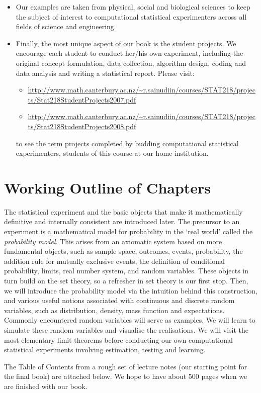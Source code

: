 \begin{itemize}
\begin{itemize}
\item Our examples are taken from physical, social and biological sciences to keep the subject of interest to computational statistical experimenters across all fields of science and engineering.
\item Finally, the most unique aspect of our book is the student projects.  We encourage each student to conduct her/his own experiment, including the original concept formulation, data collection, algorithm design, coding and data analysis and writing a statistical report. Please visit:
\begin{itemize}
\item
\href{http://www.math.canterbury.ac.nz/~r.sainudiin/courses/STAT218/projects/Stat218StudentProjects2007.pdf}{\url{http://www.math.canterbury.ac.nz/~r.sainudiin/courses/STAT218/projects/Stat218StudentProjects2007.pdf}} \item
\href{http://www.math.canterbury.ac.nz/~r.sainudiin/courses/STAT218/projects/Stat218StudentProjects2008.pdf}{\url{http://www.math.canterbury.ac.nz/~r.sainudiin/courses/STAT218/projects/Stat218StudentProjects2008.pdf}}
\end{itemize}
to see the term projects completed by budding computational statistical experimenters, students of this course at our home institution.
\end{itemize}
\end{itemize}


\section*{Working Outline of Chapters}
The statistical experiment and the basic objects that make it mathematically definitive and internally consistent are introduced later. The precursor to an experiment is a mathematical model for probability in the `real world' called the {\it probability model}.  This arises from an axiomatic system based on more fundamental objects, such as sample space, outcomes, events, probability, the addition rule for mutually exclusive events, the definition of conditional probability, limits, real number system, and random variables.  These objects in turn build on the set theory, so a refresher in set theory is our first stop.  Then, we will introduce the probability model via the intuition behind this construction, and various useful notions associated with continuous and discrete random variables, such as distribution, density, mass function and expectations.  Commonly encountered random variables will serve as examples.  We will learn to simulate these random variables and visualise the realisations.  We will visit the most elementary limit theorems before conducting our own computational statistical experiments involving estimation, testing and learning.

The Table of Contents from a rough set of lecture notes (our starting point for the final book) are attached below.  We hope to have about 500 pages when we are finished with our book.
